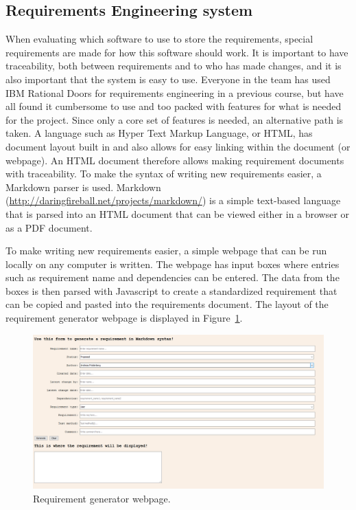 \subsection{Requirements Engineering system}
When evaluating which software to use to store the requirements,
special requirements are made for how this software should work. It is
important to have traceability, both between requirements and to who has made
changes, and  it is also important that the system is easy to use. 
Everyone in the team has used IBM Rational Doors for requirements
engineering in a previous course, but have all found it cumbersome to use and too
packed with features for what is needed for the project. Since only a core set
of features is
needed, an alternative path is taken. A language such as Hyper Text Markup
Language, or HTML, has document layout built in and also allows for easy linking
within the document (or webpage). An HTML document therefore allows making
requirement documents with
traceability. To make the syntax of writing new requirements easier, a Markdown
parser is used. Markdown (\url{http://daringfireball.net/projects/markdown/}) is
a simple text-based language that is parsed into an HTML document that can be
viewed either in a browser or as a PDF document. 

To make writing new requirements easier, a simple webpage that can be run
locally on any computer is written. The webpage has input boxes where entries
such as requirement name and dependencies can be entered. The data from the
boxes is then parsed with Javascript to create a standardized requirement that
can be copied and pasted into the requirements document. The layout of the
requirement generator webpage is displayed in Figure~\ref{fig:reqgenerator}.
\begin{figure}[H]
    \centering
    \includegraphics[width=\textwidth]{./img/reqgenerator.png}
    \caption{Requirement generator webpage.}
    \label{fig:reqgenerator}
\end{figure}

